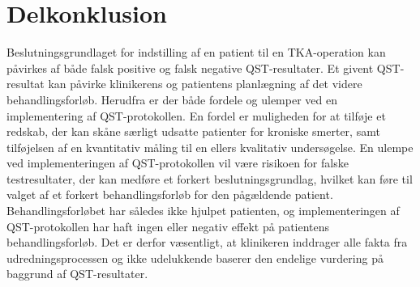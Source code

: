 \section{Delkonklusion}
Beslutningsgrundlaget for indstilling af en patient til en TKA-operation kan påvirkes af både falsk positive og falsk negative QST-resultater. Et givent QST-resultat kan påvirke klinikerens og patientens planlægning af det videre behandlingsforløb. Herudfra er der både fordele og ulemper ved en implementering af QST-protokollen. En fordel er muligheden for at tilføje et redskab, der kan skåne særligt udsatte patienter for kroniske smerter, samt tilføjelsen af en kvantitativ måling til en ellers kvalitativ undersøgelse. En ulempe ved implementeringen af QST-protokollen vil være risikoen for falske testresultater, der kan medføre et forkert beslutningsgrundlag, hvilket kan føre til valget af et forkert behandlingsforløb for den pågældende patient. Behandlingsforløbet har således ikke hjulpet patienten, og implementeringen af QST-protokollen har haft ingen eller negativ effekt på patientens behandlingsforløb. Det er derfor væsentligt, at klinikeren inddrager alle fakta fra udredningsprocessen og ikke udelukkende baserer den endelige vurdering på baggrund af QST-resultater.